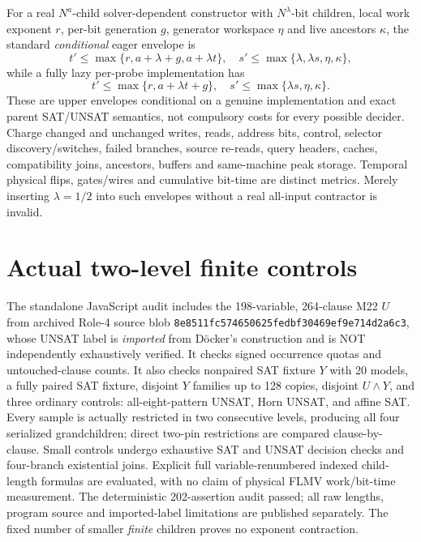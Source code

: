 \documentclass[11pt]{article}
\begin{document}
For a real $N^a$-child solver-dependent constructor with $N^\lambda$-bit children, local work exponent $r$, per-bit generation $g$, generator workspace $\eta$ and live ancestors $\kappa$, the standard \emph{conditional} eager envelope is
\[
t'\le\max\{r,a+\lambda+g,a+\lambda t\},\quad
s'\le\max\{\lambda,\lambda s,\eta,\kappa\},
\]
while a fully lazy per-probe implementation has
\[
t'\le\max\{r,a+\lambda t+g\},\quad
s'\le\max\{\lambda s,\eta,\kappa\}.
\]
These are upper envelopes conditional on a genuine implementation and exact parent SAT/UNSAT semantics, not compulsory costs for every possible decider. Charge changed and unchanged writes, reads, address bits, control, selector discovery/switches, failed branches, source re-reads, query headers, caches, compatibility joins, ancestors, buffers and same-machine peak storage. Temporal physical flips, gates/wires and cumulative bit-time are distinct metrics. Merely inserting $\lambda=1/2$ into such envelopes without a real all-input contractor is invalid.

\section{Actual two-level finite controls}
The standalone JavaScript audit includes the 198-variable, 264-clause M22 $U$ from archived Role-4 source blob \texttt{8e8511fc574650625fedbf30469ef9e714d2a6c3}, whose UNSAT label is \emph{imported} from D\"ocker's construction and is NOT independently exhaustively verified. It checks signed occurrence quotas and untouched-clause counts. It also checks nonpaired SAT fixture $Y$ with 20 models, a fully paired SAT fixture, disjoint $Y$ families up to 128 copies, disjoint $U\wedge Y$, and three ordinary controls: all-eight-pattern UNSAT, Horn UNSAT, and affine SAT. Every sample is actually restricted in two consecutive levels, producing all four serialized grandchildren; direct two-pin restrictions are compared clause-by-clause. Small controls undergo exhaustive SAT and UNSAT decision checks and four-branch existential joins. Explicit full variable-renumbered indexed child-length formulas are evaluated, with no claim of physical FLMV work/bit-time measurement. The deterministic 202-assertion audit passed; all raw lengths, program source and imported-label limitations are published separately. The fixed number of smaller \emph{finite} children proves no exponent contraction.
\end{document}
